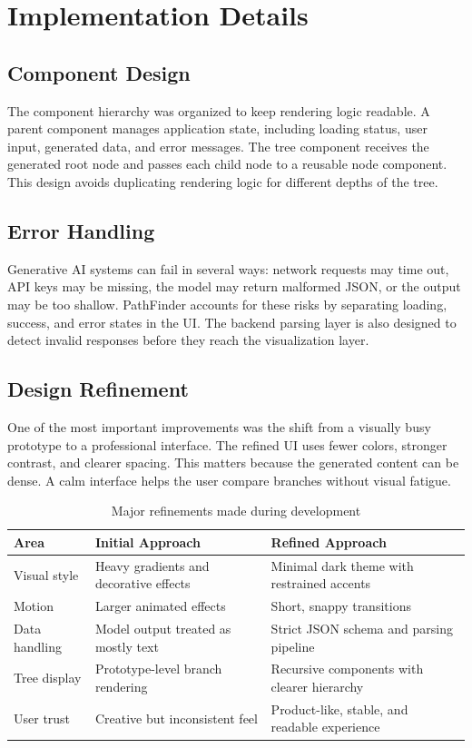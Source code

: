 \documentclass[12pt,a4paper]{report}
\begin{document}
\chapter{Implementation Details}

\section{Component Design}
The component hierarchy was organized to keep rendering logic readable. A parent component manages application state, including loading status, user input, generated data, and error messages. The tree component receives the generated root node and passes each child node to a reusable node component. This design avoids duplicating rendering logic for different depths of the tree.

\section{Error Handling}
Generative AI systems can fail in several ways: network requests may time out, API keys may be missing, the model may return malformed JSON, or the output may be too shallow. PathFinder accounts for these risks by separating loading, success, and error states in the UI. The backend parsing layer is also designed to detect invalid responses before they reach the visualization layer.

\section{Design Refinement}
One of the most important improvements was the shift from a visually busy prototype to a professional interface. The refined UI uses fewer colors, stronger contrast, and clearer spacing. This matters because the generated content can be dense. A calm interface helps the user compare branches without visual fatigue.

\begin{table}[h]
    \centering
    \renewcommand{\arraystretch}{1.5}
    \begin{tabular}{@{}p{} p{} p{}@{}}
    \toprule
    \textbf{Area} & \textbf{Initial Approach} & \textbf{Refined Approach} \\
    \midrule
    Visual style & Heavy gradients and decorative effects & Minimal dark theme with restrained accents \\
    Motion & Larger animated effects & Short, snappy transitions \\
    Data handling & Model output treated as mostly text & Strict JSON schema and parsing pipeline \\
    Tree display & Prototype-level branch rendering & Recursive components with clearer hierarchy \\
    User trust & Creative but inconsistent feel & Product-like, stable, and readable experience \\
    \bottomrule
    \end{tabular}
    \caption{Major refinements made during development}
\end{table}
\end{document}
